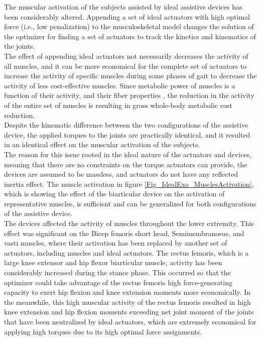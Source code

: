 \documentclass[10pt,letterpaper]{article}
\begin{document}
The muscular activation of the subjects assisted by ideal assistive devices has been considerably altered. Appending a set of ideal actuators with high optimal force (i.e., low penalization) to the musculoskeletal model changes the solution of the optimizer for finding a set of actuators to track the kinetics and kinematics of the joints.\\
The effect of appending ideal actuators not necessarily decreases the activity of all muscles, and it can be more economical for the complete set of actuators to increase the activity of specific muscles during some phases of gait to decrease the activity of less cost-effective muscles. Since metabolic power of muscles is a function of their activity, and their fiber properties \cite{106}, the reduction in the activity of the entire set of muscles is resulting in gross whole-body metabolic cost reduction.\\
Despite the kinematic difference between the two configurations of the assistive device, the applied torques to the joints are practically identical, and it resulted in an identical effect on the muscular activation of the subjects.\\
The reason for this issue rooted in the ideal nature of the actuators and devices, meaning that there are no constraints on the torque actuators can provide, the devices are assumed to be massless, and actuators do not have any reflected inertia effect. The muscle activation in figure \ref{Fig_IdealExo_MusclesActivation}, which is showing the effect of the biarticular device on the activation of representative muscles, is sufficient and can be generalized for both configurations of the assistive device. \\
The devices affected the activity of muscles throughout the lower extremity. This effect was significant on the Bicep femoris short head, Semimembranosus, and vasti muscles, where their activation has been replaced by another set of actuators, including muscles and ideal actuators.  The rectus femoris, which is a large knee extensor and hip flexor biarticular muscle,  activity has been considerably increased during the stance phase. This occurred so that the optimizer could take advantage of the rectus femoris high force-generating capacity to exert hip flexion and knee extension moments more economically. In the meanwhile, this high muscular activity of the rectus femoris resulted in high knee extension and hip flexion moments exceeding net joint moment of the joints that have been neutralized by ideal actuators, which are extremely economical for applying high torques due to its high optimal force assignments.\\
\end{document}
